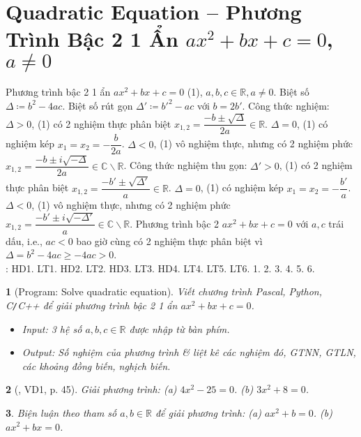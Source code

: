 \documentclass{article}
\newtheorem{baitoan}{}
\begin{document}
\section{Quadratic Equation -- Phương Trình Bậc 2 1 Ẩn $ax^2 + bx + c = 0$, $a\ne0$}
 Phương trình bậc 2 1 ẩn $ax^2 + bx + c = 0$ (1), $a,b,c\in\mathbb{R},a\ne0$. Biệt số $\Delta\coloneqq b^2 - 4ac$. Biệt số rút gọn $\Delta'\coloneqq b'^2 - ac$ với $b = 2b'$.  Công thức nghiệm: $\Delta > 0$, (1) có 2 nghiệm thực phân biệt $x_{1,2} = \dfrac{-b\pm\sqrt{\Delta}}{2a}\in\mathbb{R}$. $\Delta = 0$, (1) có nghiệm kép $x_1 = x_2 = -\dfrac{b}{2a}$. $\Delta < 0$, (1) vô nghiệm thực, nhưng có 2 nghiệm phức $x_{1,2} = \dfrac{-b\pm i\sqrt{-\Delta}}{2a}\in\mathbb{C}\backslash\mathbb{R}$.  Công thức nghiệm thu gọn: $\Delta' > 0$, (1) có 2 nghiệm thực phân biệt $x_{1,2} = \dfrac{-b'\pm\sqrt{\Delta'}}{a}\in\mathbb{R}$. $\Delta = 0$, (1) có nghiệm kép $x_1 = x_2 = -\dfrac{b'}{a}$. $\Delta < 0$, (1) vô nghiệm thực, nhưng có 2 nghiệm phức $x_{1,2} = \dfrac{-b'\pm i\sqrt{-\Delta'}}{a}\in\mathbb{C}\backslash\mathbb{R}$.  Phương trình bậc 2 $ax^2 + bx + c = 0$ với $a,c$ trái dấu, i.e., $ac < 0$ bao giờ cùng có 2 nghiệm thực phân biệt vì $\Delta = b^2 - 4ac\ge-4ac > 0$.\\

\noindent\cite[Chap. VII, \S2, pp. 52--60]{SGK_Toan_9_Canh_Dieu_tap_2}: HD1. LT1. HD2. LT2. HD3. LT3. HD4. LT4. LT5. LT6. 1. 2. 3. 4. 5. 6.

\begin{baitoan}[{\sf Program}: Solve quadratic equation]
	Viết chương trình {\sf Pascal, Python, C{\tt/}C++} để giải phương trình bậc 2 1 ẩn $ax^2 + bx + c = 0$.
	\begin{itemize}
		\item {\sf Input}: 3 hệ số $a,b,c\in\mathbb{R}$ được nhập từ bàn phím.
		\item {\sf Output}: Số nghiệm của phương trình \& liệt kê các nghiệm đó, {\rm GTNN, GTLN}, các khoảng đồng biến, nghịch biến.
	\end{itemize}
\end{baitoan}

\begin{baitoan}[\cite{Binh_boi_duong_Toan_9_tap_2}, VD1, p. 45]
	Giải phương trình: (a) $4x^2 - 25 = 0$. (b) $3x^2 + 8 = 0$.
\end{baitoan}

\begin{baitoan}
	Biện luận theo tham số $a,b\in\mathbb{R}$ để giải phương trình: (a) $ax^2 + b = 0$. (b) $ax^2 + bx = 0$.
\end{baitoan}
\end{document}
